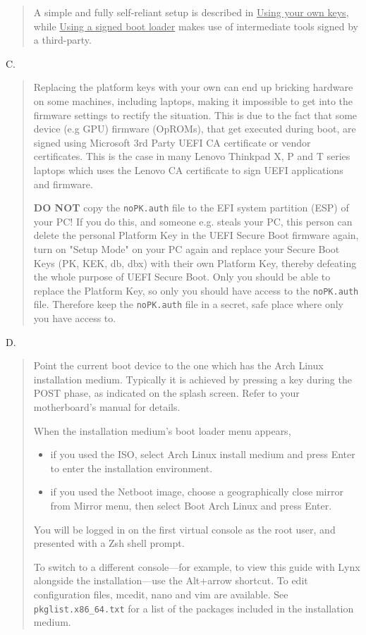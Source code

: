 \documentclass{exam-zh}
\begin{document}
\begin{question}
\begin{quote}
A simple and fully self-reliant setup is described in \underline{Using your own keys}, while \allowbreak \underline{Using a signed boot loader} makes use of intermediate tools signed by a third-party.
\end{quote}

C.
\begin{quote}
Replacing the platform keys with your own can end up bricking hardware on some machines, including laptops, making it impossible to get into the firmware settings to rectify the situation. This is due to the fact that some device (e.g GPU) firmware (OpROMs), that get executed during boot, are signed using Microsoft 3rd Party UEFI CA certificate or vendor certificates. This is the case in many Lenovo Thinkpad X, P and T series laptops which uses the Lenovo CA certificate to sign UEFI applications and firmware.

\textbf{DO NOT} copy the \texttt{noPK.auth} file to the EFI system partition (ESP) of your PC! If you do this, and someone e.g. steals your PC, this person can delete the personal Platform Key in the UEFI Secure Boot firmware again, turn on "Setup Mode" on your PC again and replace your Secure Boot Keys (PK, KEK, db, dbx) with their own Platform Key, thereby defeating the whole purpose of UEFI Secure Boot. Only you should be able to replace the Platform Key, so only you should have access to the \texttt{noPK.auth} file. Therefore keep the \texttt{noPK.auth} file in a secret, safe place where only you have access to.
\end{quote}

D.
\begin{quote}
Point the current boot device to the one which has the Arch Linux installation medium. Typically it is achieved by pressing a key during the POST phase, as indicated on the splash screen. Refer to your motherboard's manual for details.

When the installation medium's boot loader menu appears,

\begin{itemize}
\item if you used the ISO, select Arch Linux install medium and press Enter to enter the installation environment.

\item if you used the Netboot image, choose a geographically close mirror from Mirror menu, then select Boot Arch Linux and press Enter.
\end{itemize}

You will be logged in on the first virtual console as the root user, and presented with a Zsh shell prompt.

To switch to a different console—for example, to view this guide with Lynx alongside the installation—use the Alt+arrow shortcut. To edit configuration files, mcedit, nano and vim are available. See \texttt{pkglist.x86\_64.txt} for a list of the packages included in the installation medium.
\end{quote}
\end{question}
\end{document}
